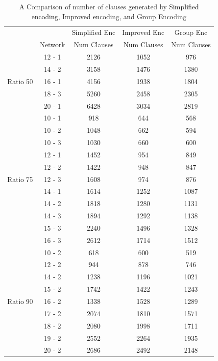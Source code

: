 \begin{table}[]
    \centering
    \begin{tabular}{c c c c c}
    \hline
    &	    			&	Simplified Enc	&	Improved Enc	&	Group Enc	\\
    &	Network			&	Num Clauses	&	Num Clauses	&	Num Clauses	\\
    \hline
    \hline
	&	12	-	1	&	2126	&	1052	&	976	\\
	&	14	-	2	&	3158	&	1476	&	1380	\\
Ratio 50	&	16	-	1	&	4156	&	1938	&	1804	\\
	&	18	-	3	&	5260	&	2458	&	2305	\\
	&	20	-	1	&	6428	&	3034	&	2819	\\
	\hline
	&	10	-	1	&	918	&	644	&	568	\\
	&	10	-	2	&	1048	&	662	&	594	\\
	&	10	-	3	&	1030	&	660	&	600	\\
	&	12	-	1	&	1452	&	954	&	849	\\
	&	12	-	2	&	1422	&	948	&	847	\\
Ratio 75	&	12	-	3	&	1608	&	974	&	876	\\
	&	14	-	1	&	1614	&	1252	&	1087	\\
	&	14	-	2	&	1818	&	1280	&	1131	\\
	&	14	-	3	&	1894	&	1292	&	1138	\\
	&	15	-	3	&	2240	&	1496	&	1328	\\
	&	16	-	3	&	2612	&	1714	&	1512	\\
	\hline
	&	10	-	2	&	618	&	600	&	519	\\
	&	12	-	2	&	944	&	878	&	746	\\
	&	14	-	2	&	1238	&	1196	&	1021	\\
	&	15	-	2	&	1742	&	1422	&	1243	\\
Ratio 90	&	16	-	2	&	1338	&	1528	&	1289	\\
	&	17	-	2	&	2074	&	1810	&	1571	\\
	&	18	-	2	&	2080	&	1998	&	1711	\\
	&	19	-	2	&	2552	&	2264	&	1935	\\
	&	20	-	2	&	2686	&	2492	&	2148	\\
	\hline
	\hline
    \end{tabular}
    \caption{A Comparison of number of clauses generated by Simplified encoding, Improved encoding, and Group Encoding}
    \label{tab:comparing the clauses}
\end{table}

